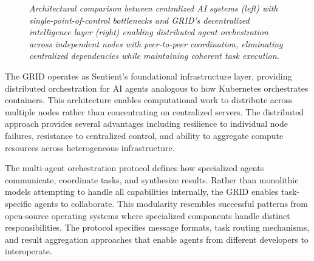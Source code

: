 \begin{figure}[h]
\caption{\textit{Architectural comparison between centralized AI systems (left) with single-point-of-control bottlenecks and GRID's decentralized intelligence layer (right) enabling distributed agent orchestration across independent nodes with peer-to-peer coordination, eliminating centralized dependencies while maintaining coherent task execution.}}
\label{fig:grid_architecture}
\end{figure}

The GRID operates as Sentient's foundational infrastructure layer, providing distributed orchestration for AI agents analogous to how Kubernetes orchestrates containers. This architecture enables computational work to distribute across multiple nodes rather than concentrating on centralized servers. The distributed approach provides several advantages including resilience to individual node failures, resistance to centralized control, and ability to aggregate compute resources across heterogeneous infrastructure.

The multi-agent orchestration protocol defines how specialized agents communicate, coordinate tasks, and synthesize results. Rather than monolithic models attempting to handle all capabilities internally, the GRID enables task-specific agents to collaborate. This modularity resembles successful patterns from open-source operating systems where specialized components handle distinct responsibilities. The protocol specifies message formats, task routing mechanisms, and result aggregation approaches that enable agents from different developers to interoperate.

